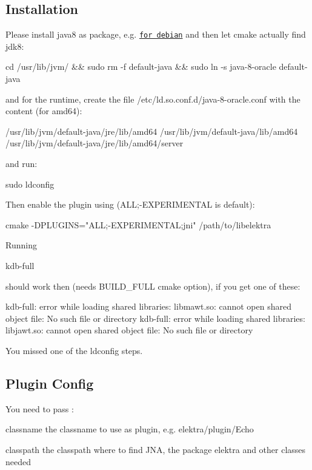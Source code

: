 \subsection*{Installation}

Please install java8 as package, e.\+g. \href{http://www.webupd8.org/2014/03/how-to-install-oracle-java-8-in-debian.html}{\tt for debian} and then let cmake actually find jdk8\+: \begin{DoxyVerb}cd /usr/lib/jvm/ && sudo rm -f default-java && sudo ln -s java-8-oracle default-java
\end{DoxyVerb}


and for the runtime, create the file {\ttfamily /etc/ld.so.\+conf.\+d/java-\/8-\/oracle.conf} with the content (for amd64)\+: \begin{DoxyVerb}/usr/lib/jvm/default-java/jre/lib/amd64
/usr/lib/jvm/default-java/lib/amd64
/usr/lib/jvm/default-java/jre/lib/amd64/server
\end{DoxyVerb}


and run\+: \begin{DoxyVerb}sudo ldconfig
\end{DoxyVerb}


Then enable the plugin using ({\ttfamily A\+L\+L;-\/\+E\+X\+P\+E\+R\+I\+M\+E\+N\+T\+A\+L} is default)\+: \begin{DoxyVerb}cmake -DPLUGINS="ALL;-EXPERIMENTAL;jni" /path/to/libelektra
\end{DoxyVerb}


Running \begin{DoxyVerb}kdb-full
\end{DoxyVerb}


should work then (needs B\+U\+I\+L\+D\+\_\+\+F\+U\+L\+L cmake option), if you get one of these\+: \begin{DoxyVerb}kdb-full: error while loading shared libraries: libmawt.so: cannot open shared object file: No such file or directory
kdb-full: error while loading shared libraries: libjawt.so: cannot open shared object file: No such file or directory
\end{DoxyVerb}


You missed one of the ldconfig steps.

\subsection*{Plugin Config}

You need to pass \+:
\begin{DoxyItemize}
\item classname the classname to use as plugin, e.\+g. {\ttfamily elektra/plugin/\+Echo}
\item classpath the classpath where to find J\+N\+A, the package elektra and other classes needed
\end{DoxyItemize}

